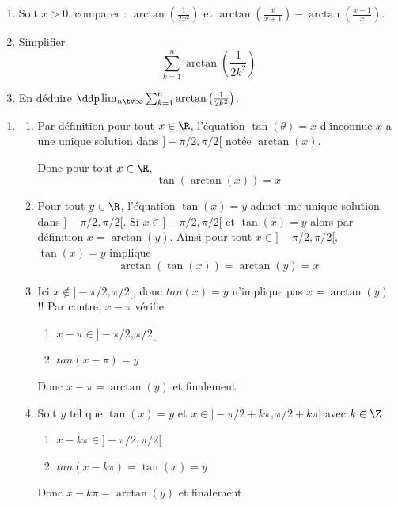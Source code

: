 \begin{exercice}
\begin{enumerate}
\item Soit $x>0$, comparer : 
$\arctan\left(\frac{1}{2x^2}\right) $ et 
$\arctan\left(\frac{x}{x+1}\right)-\arctan\left(\frac{x-1}{x}\right)$.
\item Simplifier 
$$\sum_{k=1}^n \arctan\left(\frac{1}{2k^2}\right)$$
\item En déduire $\ddp \lim_{n\tv \infty}\sum_{k=1}^n \arctan\left(\frac{1}{2k^2}\right)$.
\end{enumerate}
\end{exercice}


\begin{correction}
\begin{enumerate}
\item \begin{enumerate}
\item 
Par définition pour tout $x\in \R$, l'équation $\tan(\theta)=x$ d'inconnue $x$ a une unique solution dans $]-\pi/2, \pi/2[$ notée $\arctan (x)$. 

Donc pour tout $x\in \R$, $$\tan(\arctan(x))=x$$

\item Pour tout  $y \in \R$, l'équation $\tan(x)=y$ admet une unique solution dans $]-\pi/2, \pi/2[$. 
Si $x\in  ]-\pi/2, \pi/2[$ et $\tan(x)=y$ alors par définition $x=\arctan (y)$. Ainsi pour tout $x\in ]-\pi/2, \pi/2[$, $\tan(x)=y$ implique 
$$\arctan(\tan(x))= \arctan(y) = x$$

\item Ici $x \notin ]-\pi/2, \pi/2[$, donc $tan(x)=y$ n'implique pas 
$x=\arctan(y)$ !! Par contre, $x-\pi $ vérifie 
\begin{enumerate}
\item $x-\pi \in   ]-\pi/2, \pi/2[$
\item  $tan(x-\pi)=y$
\end{enumerate}
Donc $x-\pi = \arctan(y)$ et finalement 
\conclusion{$ \forall x\in ]\pi/2, 3\pi/2[, \, \arctan(\tan(x)) = \arctan(y) =x-\pi$}


\item Soit $y$ tel que $\tan(x)=y$ et $x\in  ]-\pi/2+k\pi, \pi/2+k\pi[$ avec $k\in \Z$ 
\begin{enumerate}
\item $x-k \pi \in   ]-\pi/2, \pi/2[$
\item  $tan(x-k\pi)=\tan(x)=y$
\end{enumerate}
Donc $x-k\pi =\arctan(y)$ et finalement 
\conclusion{$ \forall x\in]-\pi/2+k\pi, \pi/2+k\pi[, \, \arctan(\tan(x)) = \arctan(y) =x-k\pi$}



\end{enumerate}
\end{enumerate}
\end{correction}
